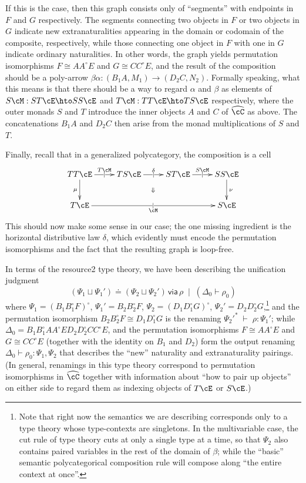 \documentclass{amsart}
\newcommand{\C}{\cC}
\renewcommand{\Chat}{\ensuremath{\widehat{\C}}\xspace}
\newcommand{\E}{\cE}
\renewcommand{\o}{^{\circ}}
\def\types{\;\vdash\;} %
\def\cb{\;\mid\;} %
\newcommand\combine{,}
\newcommand\combineU{\sqcup}
\def\flip#1{#1^*} %
\newcommand{\unif}[4]{#1\doteq #2\,\mathsf{ via }\,#3\cb #4}
\begin{document}
If this is the case, then this graph consists only of ``segments'' with endpoints in $F$ and $G$ respectively.
The segments connecting two objects in $F$ or two objects in $G$ indicate new extranaturalities appearing in the domain or codomain of the composite, respectively, while those connecting one object in $F$ with one in $G$ indicate ordinary naturalities.
In other words, the graph yields permutation isomorphisms $F \cong A A\o E$ and $G \cong C C\o E$, and the result of the composition should be a poly-arrow $\beta\alpha : (B_1 A, M_1) \to (D_2 C,N_2)$.
Formally speaking, what this means is that there should be a way to regard $\alpha$ and $\beta$ as elements of $S\cM : ST\E \hto SS\E$ and $T\cM : TT\E \hto TS\E$ respectively, where the outer monads $S$ and $T$ introduce the inner objects $A$ and $C$ of \Chat as above.
The concatenations $B_1 A$ and $D_2 C$ then arise from the monad multiplications of $S$ and $T$.

Finally, recall that in a generalized polycategory, the composition is a cell
\[ \xymatrix{ TT\E \ar[r]|{|}^{T \cM} \ar[d]_{\mu} \ar@{}[drrr]|{\Downarrow} &
  T S \E \ar[r]|{|}^{\delta} & S T \E \ar[r]|{|}^{S \cM} & S S \E \ar[d]^{\nu}\\
  T \E \ar[rrr]|{|}_\cM &&& S \E}\]
This should now make some sense in our case; the one missing ingredient is the horizontal distributive law $\delta$, which evidently must encode the permutation isomorphisms and the fact that the resulting graph is loop-free.

In terms of the resource2 type theory, we have been describing the unification judgment
\[
\unif{(\Psi_1 \combineU \Psi_1')} {(\Psi_2 \combineU \Psi_2')} {\rho} {(\Delta_0 \vdash \rho_0)}
\]
where $\Psi_1 = (B_1 B_1\o F)\o$, $\Psi_1' = B_2 B_2\o F$, $\Psi_2 = (D_1 D_1\o G)\o$, $\Psi_2' = D_2 D_2\o G$,\footnote{Note that right now the semantics we are describing corresponds only to a type theory whose type-contexts are singletons.  In the multivariable case, the cut rule of type theory cuts at only a single type at a time, so that $\Psi_2$ also contains paired variables in the rest of the domain of $\beta$; while the ``basic'' semantic polycategorical composition rule will compose along ``the entire context at once''.} and the permutation isomorphism $B_2 B_2\o F \cong D_1 D_1\o G$ is the renaming $\flip{\Psi_2'} \types \rho : \Psi_1'$; while $\Delta_0 = B_1 B_1\o A A\o E D_2 D_2\o C C\o E$, and the permutation isomorphisms $F \cong A A\o E$ and $G \cong C C\o E$ (together with the identity on $B_1$ and $D_2$) form the output renaming $\Delta_0 \vdash \rho_0 : \Psi_1 \combine \Psi_2$ that describes the ``new'' naturality and extranaturality pairings.
(In general, renamings in this type theory correspond to permutation isomorphisms in \Chat together with information about ``how to pair up objects'' on either side to regard them as indexing objects of $T\E$ or $S\E$.)
\end{document}
